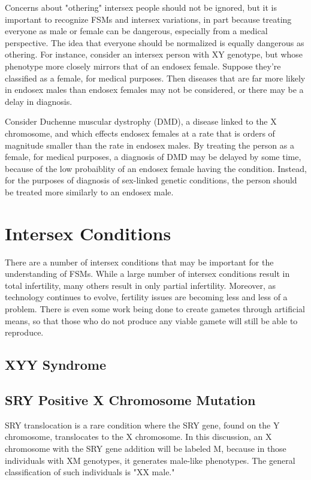 \documentclass{article}
\begin{document}
Concerns about "othering" intersex people should not be ignored, but it is important to recognize FSMs and intersex variations, in part because treating everyone as male or female can be dangerous, especially from a medical perspective. The idea that everyone should be normalized is equally dangerous as othering. For instance, consider an intersex person with XY genotype, but whose phenotype more closely mirrors that of an endosex female. Suppose they're classified as a female, for medical purposes. Then diseases that are far more likely in endosex males than endosex females may not be considered, or there may be a delay in diagnosis.

Consider Duchenne muscular dystrophy (DMD), a disease linked to the X chromosome, and which effects endosex females at a rate that is orders of magnitude smaller than the rate in endosex males. By treating the person as a female, for medical purposes, a diagnosis of DMD may be delayed by some time, because of the low probaiblity of an endosex female having the condition. Instead, for the purposes of diagnosis of sex-linked genetic conditions, the person should be treated more similarly to an endosex male.
\section{Intersex Conditions}
There are a number of intersex conditions that may be important for the understanding of FSMs. While a large number of intersex conditions result in total infertility, many others result in only partial infertility. Moreover, as technology continues to evolve, fertility issues are becoming less and less of a problem. There is even some work being done to create gametes through artificial means, so that those who do not produce any viable gamete will still be able to reproduce. 
\subsection{XYY Syndrome}
\subsection{SRY Positive X Chromosome Mutation}
SRY translocation is a rare condition where the SRY gene, found on the Y chromosome, translocates to the X chromosome. In this discussion, an X chromosome with the SRY gene addition will be labeled M, because in those individuals with XM genotypes, it generates male-like phenotypes. The general classification of such individuals is "XX male." 
\end{document}

